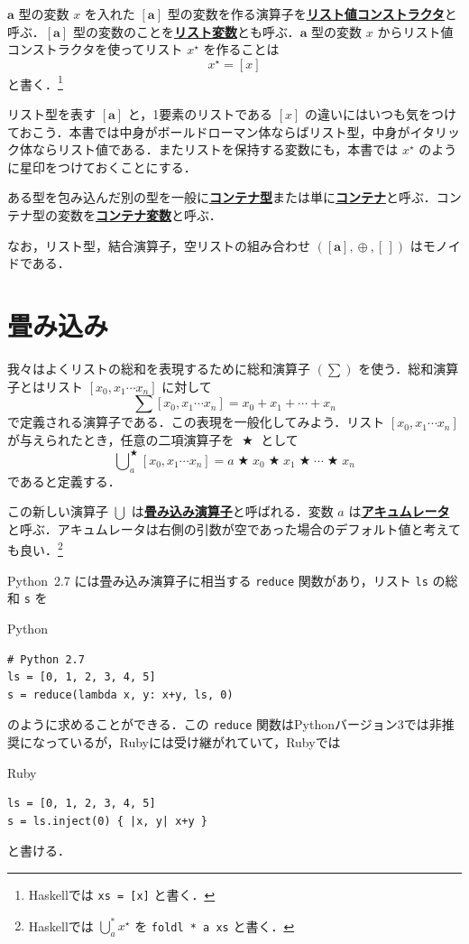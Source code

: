 \documentclass[a4paper,twocolumn]{jsbook}
\newcommand{\programminglanguage}[1]{\textsf{#1}}
\newcommand{\haskell}{\programminglanguage{Haskell}}
\newcommand{\python}{\programminglanguage{Python}}
\newcommand{\ruby}{\programminglanguage{Ruby}}
\newcommand{\keyword}[1]{{\underline{\textbf{#1}}}}
\newcommand{\code}[1]{\texttt{#1}}
\newenvironment{pythoncode}{\begin{itembox}[r]{\python}}{\end{itembox}}
\newenvironment{rubycode}{\begin{itembox}[r]{\ruby}}{\end{itembox}}
\newcommand{\mEmptyList}{{[\,]}}
\DeclareMathOperator{\mAppend}{\oplus}
\DeclareMathOperator{\mBinOp}{\bigstar}
\DeclareMathOperator*{\mFold}{\bigcup}
\newcommand{\mType}[1]{\mathbf{#1}}
\newcommand{\mListWith}[1]{\left[#1\right]}
\newcommand{\mTupleWith}[1]{\left(#1\right)}
\newcommand{\mListType}[1]{\mListWith{\mType{#1}}}
\newcommand{\mList}[1]{{#1}^\mathrm{\star}}
\begin{document}
$\mType{a}$ 型の変数 $x$ を入れた $\mListType{a}$ 型の変数を作る演算子を\keyword{リスト値コンストラクタ}と呼ぶ．$\mListType{a}$ 型の変数のことを\keyword{リスト変数}とも呼ぶ．$\mType{a}$ 型の変数 $x$ からリスト値コンストラクタを使ってリスト $\mList{x}$ を作ることは
\begin{equation}
\mList{x}=\mListWith{x}
\end{equation}
と書く．\footnote{\haskell では \code{xs = [x]} と書く．}

リスト型を表す $\mListType{a}$ と，1要素のリストである $\mListWith{x}$ の違いにはいつも気をつけておこう．本書では中身がボールドローマン体ならばリスト型，中身がイタリック体ならリスト値である．またリストを保持する変数にも，本書では $\mList{x}$ のように星印をつけておくことにする．

ある型を包み込んだ別の型を一般に\keyword{コンテナ型}または単に\keyword{コンテナ}と呼ぶ．コンテナ型の変数を\keyword{コンテナ変数}と呼ぶ．

なお，リスト型，結合演算子，空リストの組み合わせ $\mTupleWith{\mListType{a},\mAppend,\mEmptyList}$ はモノイドである．

\section{畳み込み}

我々はよくリストの総和を表現するために総和演算子 $(\sum)$ を使う．総和演算子とはリスト $\mListWith{x_0,x_1\dotsb x_n}$ に対して
\begin{equation}
\sum\mListWith{x_0,x_1\dotsb x_n}=x_0+x_1+\dotsb+x_n
\end{equation}
で定義される演算子である．この表現を一般化してみよう．リスト $\mListWith{x_0,x_1\dotsb x_n}$ が与えられたとき，任意の二項演算子を $\mBinOp$ として
\begin{equation}
\mFold^{\mBinOp}_a\mListWith{x_0,x_1\dotsb x_n}
=a\mBinOp x_0\mBinOp x_1\mBinOp\dotsb\mBinOp x_n
\end{equation}
であると定義する．

この新しい演算子 $\mFold$ は\keyword{畳み込み演算子}と呼ばれる．変数 $a$ は\keyword{アキュムレータ}と呼ぶ．アキュムレータは右側の引数が空であった場合のデフォルト値と考えても良い．\footnote{\haskell では $\mFold^*_a\mList{x}$ を \code{foldl * a xs} と書く．}

\python\ 2.7 には畳み込み演算子に相当する \code{reduce} 関数があり，リスト \code{ls} の総和 \code{s} を
\begin{pythoncode}
\begin{verbatim}
# Python 2.7
ls = [0, 1, 2, 3, 4, 5]
s = reduce(lambda x, y: x+y, ls, 0)
\end{verbatim}
\end{pythoncode}
のように求めることができる．この \code{reduce} 関数は\python バージョン3では非推奨になっているが，\ruby には受け継がれていて，\ruby では
\begin{rubycode}
\begin{verbatim}
ls = [0, 1, 2, 3, 4, 5]
s = ls.inject(0) { |x, y| x+y }
\end{verbatim}
\end{rubycode}
と書ける．
\end{document}
